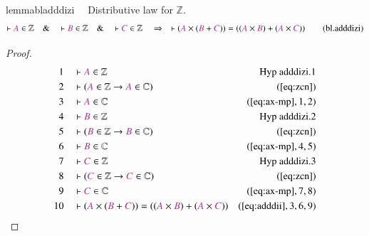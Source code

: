 \begin{restatable}{lemma}{bladddizi}~~ Distributive law for $\mathbb{Z}$.
\begin{align}
\vdash \mc{A} \in \mathbb{Z}\quad\&\quad \vdash \mc{B} \in
    \mathbb{Z}\quad\&\quad \vdash \mc{C} \in \mathbb{Z}\quad\Rightarrow\quad
    \vdash ( \mc{A} \times ( \mc{B} + \mc{C} ) ) = ( ( \mc{A} \times \mc{B} ) + (
    \mc{A} \times \mc{C} ) )\label{eq:bl.adddizi}\tag{bl.adddizi}
\end{align}
\end{restatable}

\begin{proof}
\begin{align}
  1 &&  & \vdash \mc{A} \in \mathbb{Z}&\text{Hyp~adddizi.1}\notag%
  \\ 2 &&  & \vdash ( \mc{A} \in \mathbb{Z} \rightarrow \mc{A} \in \mathbb{C}
      )&(\mbox{\ref{eq:zcn}})\notag
  \\ 3 &&  & \vdash \mc{A} \in \mathbb{C}&(\mbox{\ref{eq:ax-mp}},1,2)\notag
  \\ 4 &&  & \vdash \mc{B} \in
      \mathbb{Z}&\text{Hyp~adddizi.2}\notag%
  \\ 5 &&  & \vdash ( \mc{B} \in \mathbb{Z} \rightarrow \mc{B} \in \mathbb{C}
      )&(\mbox{\ref{eq:zcn}})\notag
  \\ 6 &&  & \vdash \mc{B} \in \mathbb{C}&(\mbox{\ref{eq:ax-mp}},4,5)\notag
  \\ 7 &&  & \vdash \mc{C} \in
      \mathbb{Z}&\text{Hyp~adddizi.3}\notag%
  \\ 8 &&  & \vdash ( \mc{C} \in \mathbb{Z} \rightarrow \mc{C} \in \mathbb{C}
      )&(\mbox{\ref{eq:zcn}})\notag
  \\ 9 &&  & \vdash \mc{C} \in \mathbb{C}&(\mbox{\ref{eq:ax-mp}},7,8)\notag
  \\ 10 &&  & \vdash ( \mc{A} \times ( \mc{B} + \mc{C} ) ) = ( ( \mc{A} \times
      \mc{B} ) + ( \mc{A} \times \mc{C} )
      )&(\mbox{\ref{eq:adddii}},3,6,9)\notag
\end{align}
\end{proof}

